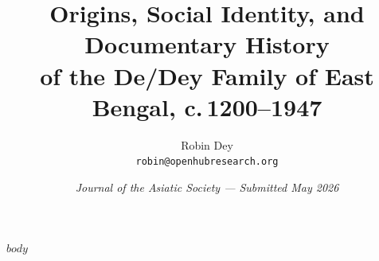 \documentclass[11pt,a4paper]{article}
\title{\textbf{Origins, Social Identity, and Documentary History\\[4pt]%
  of the De/Dey Family of East Bengal, c.\,1200--1947}}
\author{Robin Dey\\[4pt]\small\texttt{robin@openhubresearch.org}}
\date{\small\itshape Journal of the Asiatic Society \textnormal{---} Submitted May 2026}
\begin{document}
\maketitle
\thispagestyle{fancy}
$body$
\end{document}

